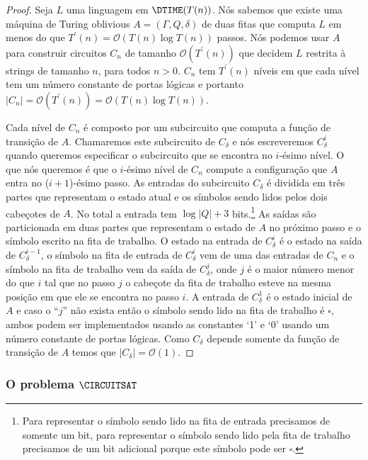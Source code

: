 \begin{proof}

Seja $L$ uma linguagem em $\DTIME(T(n))$. Nós sabemos que existe uma máquina de Turing oblivious $A = (\Gamma, Q, \delta)$ de duas fitas que computa $L$ em menos do que $T^{\prime}(n) = \mathcal{O}(T(n)\log T(n))$ passos. Nós podemos usar $A$ para construir circuitos $C_{n}$ de tamanho $\mathcal{O}(T^{\prime}(n))$ que decidem $L$ restrita à strings de tamanho $n$, para todos $n > 0$. $C_{n}$ tem $T^{\prime}(n)$ níveis em que cada nível tem um número constante de portas lógicas e portanto $\lvert C_{n} \rvert = \mathcal{O}(T^{\prime}(n)) = \mathcal{O}(T(n) \log T(n))$.

Cada nível de $C_{n}$ é composto por um subcircuito que computa a função de transição de $A$. Chamaremos este subcircuito de $C_{\delta}$ e nós escreveremos $C_{\delta}^{i}$ quando queremos especificar o subcircuito que se encontra no $i$-ésimo nível. O que nós queremos é que o $i$-ésimo nível de $C_{n}$ compute a configuração que $A$ entra no ($i + 1$)-ésimo passo. As entradas do subcircuito $C_{\delta}$ é dividida em três partes que representam o estado atual e os símbolos sendo lidos pelos dois cabeçotes de $A$. No total a entrada tem $\log\lvert Q\rvert + 3$ bits.\footnote{Para representar o símbolo sendo lido na fita de entrada precisamos de somente um bit, para representar o símbolo sendo lido pela fita de trabalho precisamos de um bit adicional porque este símbolo pode ser $\square$.} As saídas são particionada em duas partes que representam o estado de $A$ no próximo passo e o símbolo escrito na fita de trabalho. O estado na entrada de $C_{\delta}^{i}$ é o estado na saída de $C_{\delta}^{i - 1}$, o símbolo na fita de entrada de $C_{\delta}^{i}$ vem de uma das entradas de $C_{n}$ e o símbolo na fita de trabalho vem da saída de $C_{\delta}^{j}$, onde $j$ é o maior número menor do que $i$ tal que no passo $j$ o cabeçote da fita de trabalho esteve na mesma posição em que ele se encontra no passo $i$. A entrada de $C_{\delta}^{1}$ é o estado inicial de $A$ e caso o ``$j$'' não exista então o símbolo sendo lido na fita de trabalho é $\square$, ambos podem ser implementados usando as constantes `1' e `0' usando um número constante de portas lógicas. Como $C_{\delta}$ depende somente da função de transição de $A$ temos que $\lvert C_{\delta} \vert = \mathcal{O}(1)$.

\end{proof}

\subsubsection{O problema $\CIRCUITSAT$}

